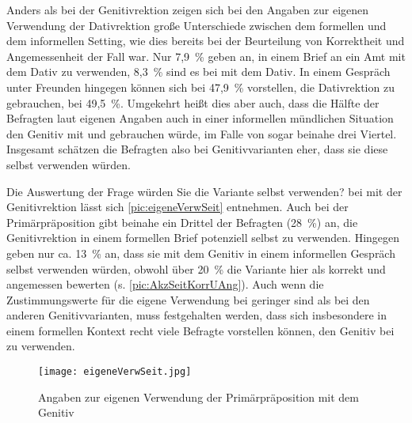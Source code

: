 Anders als bei der Genitivrektion zeigen sich bei den Angaben zur eigenen Verwendung der Dativrektion große Unterschiede zwischen dem formellen und dem informellen Setting, wie dies bereits bei der Beurteilung von Korrektheit und Angemessenheit der Fall war. 
Nur 7,9~\% geben an, in einem Brief an ein Amt \wegen{} mit dem Dativ zu verwenden, 8,3~\% sind es bei \waehrend{} mit dem Dativ. 
In einem Gespräch unter Freunden hingegen können sich bei \wegen{} 47,9~\% vorstellen, die Dativrektion zu gebrauchen, bei \waehrend{} 49,5~\%. 
Umgekehrt heißt dies aber auch, dass die Hälfte der Befragten laut eigenen Angaben auch in einer informellen mündlichen Situation den Genitiv mit \wegen{} und \waehrend{} gebrauchen würde, im Falle von \dank{} sogar beinahe drei Viertel. 
Insgesamt schätzen die Befragten also bei Genitivvarianten eher, dass sie diese selbst verwenden würden.

Die Auswertung der Frage \glqq würden Sie die Variante selbst verwenden?\grqq{} bei  mit der Genitivrektion lässt sich \autoref{pic:eigeneVerwSeit} entnehmen. 
Auch bei der Primärpräposition  gibt beinahe ein Drittel der Befragten (28~\%) an, die Genitivrektion in einem formellen Brief potenziell selbst zu verwenden. 
Hingegen geben nur ca. 13~\% an, dass sie  mit dem Genitiv in einem informellen Gespräch selbst verwenden würden, obwohl über 20~\% die Variante hier als korrekt und angemessen bewerten (s. \autoref{pic:AkzSeitKorrUAng}). 
Auch wenn die Zustimmungswerte für die eigene Verwendung bei  geringer sind als bei den anderen Genitivvarianten, muss festgehalten werden, dass sich insbesondere in einem formellen Kontext recht viele Befragte vorstellen können, den Genitiv bei  zu verwenden. 
\begin{figure}
\centering
\texttt{[image: eigeneVerwSeit.jpg]}
\caption{Angaben zur eigenen Verwendung der Primärpräposition  mit dem Genitiv}
\label{pic:eigeneVerwSeit}
\end{figure}

